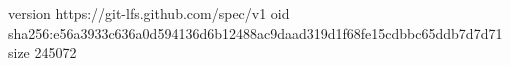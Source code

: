 version https://git-lfs.github.com/spec/v1
oid sha256:e56a3933c636a0d594136d6b12488ac9daad319d1f68fe15cdbbc65ddb7d7d71
size 245072
